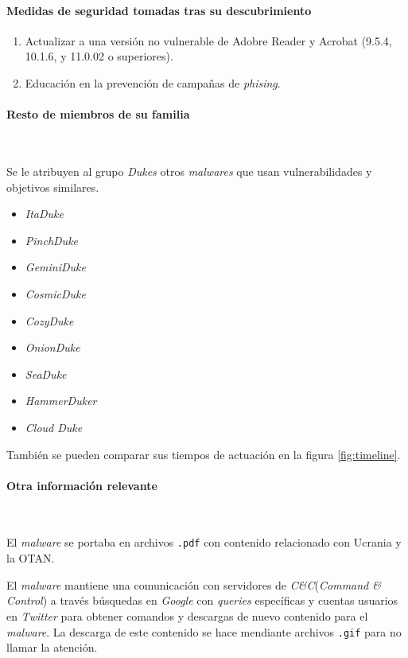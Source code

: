 \documentclass[11pt,a4paper]{article}
\begin{document}
\paragraph{Medidas de seguridad tomadas tras su descubrimiento}
\begin{enumerate}
\item Actualizar a una versión no vulnerable de Adobre Reader y Acrobat (9.5.4, 10.1.6, y 11.0.02 o superiores).
\item Educación en la prevención de campañas de \emph{phising}.
\end{enumerate}

\paragraph{Resto de miembros de su familia}~\\\qquad

Se le atribuyen al grupo \emph{Dukes} otros \emph{malwares} que usan
vulnerabilidades y objetivos similares.\cite{Dukes}
\begin{itemize}[noitemsep]
\item \emph{ItaDuke}
\item \emph{PinchDuke}
\item \emph{GeminiDuke}
\item \emph{CosmicDuke}
\item \emph{CozyDuke}
\item \emph{OnionDuke}
\item \emph{SeaDuke}
\item \emph{HammerDuker}
\item \emph{Cloud Duke}
\end{itemize}

También se pueden comparar sus tiempos de actuación en la figura \ref{fig:timeline}.

\paragraph{Otra información relevante}~\\\qquad 
\vspace{-10}

El \emph{malware} se portaba en archivos \texttt{.pdf} con contenido
relacionado con Ucrania y la OTAN.\cite{Kaspersky}

El \emph{malware} mantiene una comunicación con servidores de
\emph{C\&C}(\emph{Command \& Control}) a
través búsquedas en \emph{Google} con \emph{queries} específicas y
cuentas usuarios en \emph{Twitter} para obtener comandos y descargas
de nuevo contenido para el \emph{malware}. La descarga de este
contenido se hace mendiante archivos \texttt{.gif} para no llamar la
atención.\cite{Crysys13}
\end{document}

